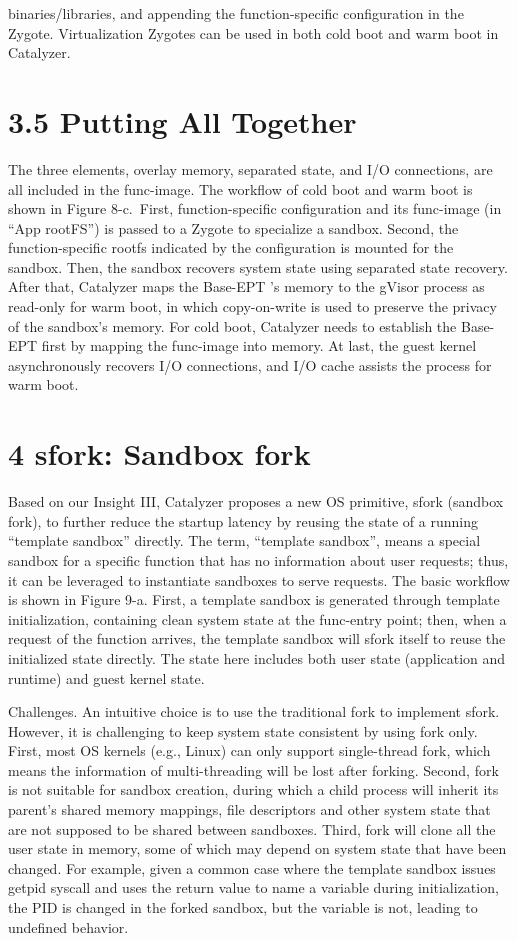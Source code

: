\documentclass[
  10
]{article}
\begin{document}
binaries/libraries, and appending the function-specific configuration in
the Zygote. Virtualization Zygotes can be used in both cold boot and
warm boot in Catalyzer.

\section{3.5 Putting All Together}\label{putting-all-together}

The three elements, overlay memory, separated state, and I/O
connections, are all included in the func-image. The workflow of cold
boot and warm boot is shown in Figure 8-c.~First, function-specific
configuration and its func-image (in ``App rootFS'') is passed to a
Zygote to specialize a sandbox. Second, the function-specific rootfs
indicated by the configuration is mounted for the sandbox. Then, the
sandbox recovers system state using separated state recovery. After
that, Catalyzer maps the Base-EPT 's memory to the gVisor process as
read-only for warm boot, in which copy-on-write is used to preserve the
privacy of the sandbox's memory. For cold boot, Catalyzer needs to
establish the Base-EPT first by mapping the func-image into memory. At
last, the guest kernel asynchronously recovers I/O connections, and I/O
cache assists the process for warm boot.

\section{4 sfork: Sandbox fork}\label{sfork-sandbox-fork}

Based on our Insight III, Catalyzer proposes a new OS primitive, sfork
(sandbox fork), to further reduce the startup latency by reusing the
state of a running ``template sandbox'' directly. The term, ``template
sandbox'', means a special sandbox for a specific function that has no
information about user requests; thus, it can be leveraged to
instantiate sandboxes to serve requests. The basic workflow is shown in
Figure 9-a. First, a template sandbox is generated through template
initialization, containing clean system state at the func-entry point;
then, when a request of the function arrives, the template sandbox will
sfork itself to reuse the initialized state directly. The state here
includes both user state (application and runtime) and guest kernel
state.

Challenges. An intuitive choice is to use the traditional fork to
implement sfork. However, it is challenging to keep system state
consistent by using fork only. First, most OS kernels (e.g., Linux) can
only support single-thread fork, which means the information of
multi-threading will be lost after forking. Second, fork is not suitable
for sandbox creation, during which a child process will inherit its
parent's shared memory mappings, file descriptors and other system state
that are not supposed to be shared between sandboxes. Third, fork will
clone all the user state in memory, some of which may depend on system
state that have been changed. For example, given a common case where the
template sandbox issues getpid syscall and uses the return value to name
a variable during initialization, the PID is changed in the forked
sandbox, but the variable is not, leading to undefined behavior.
\end{document}

